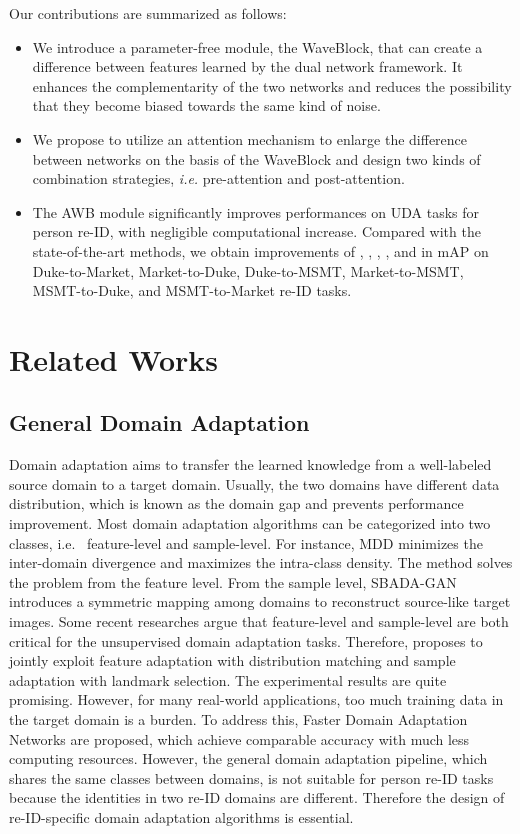 \documentclass[journal]{IEEEtran}
\begin{document}
Our contributions are summarized as follows:
\begin{itemize}
  \item We introduce a parameter-free module, the WaveBlock, that can create a difference between features learned by the dual network framework. It enhances the complementarity of the two networks and reduces the possibility that they become biased towards the same kind of noise.
  \item We propose to utilize an attention mechanism to enlarge the difference between networks on the basis of the WaveBlock and design two kinds of combination strategies, \textit{i.e.} pre-attention and post-attention. 
  \item The AWB module significantly improves performances on UDA tasks for person re-ID, with negligible computational increase. Compared with the state-of-the-art methods, we obtain improvements of , , , ,  and  in mAP on Duke-to-Market, Market-to-Duke, Duke-to-MSMT, Market-to-MSMT, MSMT-to-Duke, and MSMT-to-Market re-ID tasks. 
\end{itemize}

\section{Related Works}
\subsection{General Domain Adaptation}
Domain adaptation aims to transfer the learned knowledge from a well-labeled source domain to a target domain.  Usually, the two domains have different data distribution, which is known as the domain gap and prevents performance improvement. Most domain adaptation algorithms \cite{long2016unsupervised, saito2018maximum, ganin2015unsupervised, Kang_2019_CVPR, sener2016learning, Pinheiro_2018_CVPR} can be categorized into two classes, i.e. \ feature-level and sample-level.  For instance,  MDD \cite{li2020maximum} minimizes the inter-domain divergence and maximizes the intra-class density. The method solves the problem from the feature level. From the sample level, SBADA-GAN \cite{russo2018source} introduces a symmetric mapping among domains to reconstruct source-like target images. Some recent researches argue that feature-level and sample-level are both critical for the unsupervised domain adaptation tasks.  Therefore,  \cite{li2019locality} proposes to jointly exploit feature adaptation with distribution matching and sample adaptation with landmark selection. The experimental results are quite promising. However, for many real-world applications, too much training data in the target domain is a burden. To address this, Faster Domain Adaptation Networks \cite{li2021faster} are proposed, which achieve comparable accuracy with much less computing resources.  However, the general domain adaptation pipeline, which shares the same classes between domains, is not suitable for person re-ID tasks because the identities in two re-ID domains are different. Therefore the design of re-ID-specific domain adaptation algorithms is essential.
\end{document}
